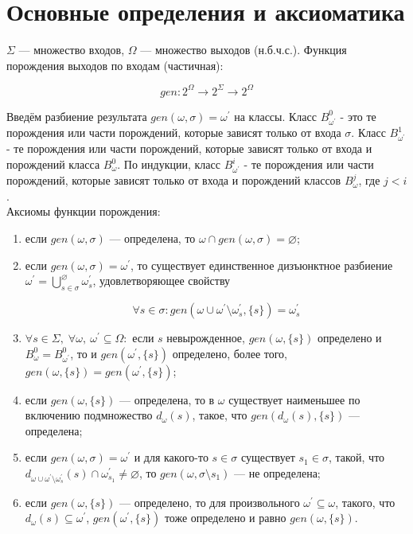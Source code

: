 \section{Основные определения и аксиоматика}

$\Sigma$ --- множество входов, $\Omega$ --- множество выходов (н.б.ч.с.). Функция порождения
выходов по входам (частичная):

$$
gen : 2^\Omega\to 2^\Sigma\to 2^\Omega
$$

Введём разбиение результата $gen(\omega, \sigma) = \omega^\prime$ на классы. Класс $B^0_{\omega^\prime}$ - это те порождения или части порождений, которые зависят только от входа $\sigma$. Класс $B^1_{\omega^\prime}$ - те порождения или части порождений, которые зависят только от входа и порождений класса $B^0_{\omega}$. По индукции, класс $B^i_{\omega^\prime}$ - те порождения или части порождений, которые зависят только от входа и порождений классов $B^j_{\omega}$, где $j < i$.\\

Аксиомы функции порождения:

\begin{enumerate}
	\item если $gen(\omega,\sigma)$ --- определена, то $\omega\cap gen(\omega,\sigma)=\varnothing$;
	
	\item если $gen(\omega,\sigma)=\omega^\prime$, то существует единственное дизъюнктное разбиение $\omega^\prime=\bigcup^\varnothing_{s\in\sigma}\omega^\prime_s$, 
	удовлетворяющее свойству 

	$$\forall s\in\sigma : gen(\omega\cup\omega^\prime\setminus\omega^\prime_s,\{s\})=\omega^\prime_s$$

	\item $\forall s\in\Sigma,\; \forall\omega,\:\omega^\prime\subseteq\Omega:$ если $s$ невырожденное, $gen(\omega,\{s\})$ определено и $B^0_{\omega} = B^0_{\omega^\prime}$, то и $gen(\omega^\prime,\{s\})$ определено, более того, $gen(\omega,\{s\}) = gen(\omega^\prime,\{s\})$;

	\item если $gen(\omega,\{s\})$ --- определена, то в $\omega$ существует наименьшее по включению подмножество $d_\omega(s)$, такое, что
	$gen(d_\omega(s), \{s\})$ --- определена;

	\item если $gen(\omega,\sigma)=\omega^\prime$ и для какого-то $s\in\sigma$ существует $s_1\in\sigma$, такой, что
	$d_{\omega\cup\omega^\prime\setminus\omega^\prime_s}(s) \cap \omega^\prime_{s_1}\ne\varnothing$, 
	то $gen(\omega,\sigma\setminus s_1)$ --- не определена;
	
	\item если $gen(\omega,\{s\})$ --- определено, то для произвольного $\omega^\prime\subseteq\omega$, такого, что $d_\omega(s)\subseteq\omega^\prime$, $gen(\omega^\prime, \{s\})$ тоже определено и равно $gen(\omega,\{s\})$.
\end{enumerate}